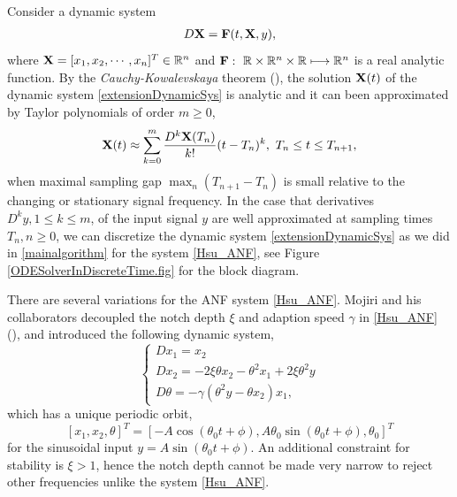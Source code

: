 \documentclass{UCF_ETD}
\begin{document}
Consider a  dynamic system
\begin{eqnarray} \label{extensionDynamicSys}
D{\bf X} = {\bf F}(t,{\bf X},y),
\end{eqnarray}
where
 ${\bf X} = [x_1,x_2,\cdots,x_n]^T \in {\mathbb R}^n$ and  ${\bf F}:\ {\mathbb R}\times {\mathbb R}^{n}\times {\mathbb R}\longmapsto {\mathbb R}^n$
is a real analytic function.
By  the  \emph{Cauchy-Kowalevskaya} theorem  (\cite{evans98}), the solution ${\bf X}(t)$ of
the dynamic system \eqref{extensionDynamicSys}
is analytic and it can been approximated by
Taylor polynomials of order $m\ge 0$, %
 \begin{equation}\label{generalxtapproximation}
 {\bf X}(t)\approx \sum_{k=0}^m \frac{D^k {\bf X}(T_n)}{k!} (t-T_n)^k,\  T_n\le t\le T_{n+1},
 \end{equation}
 when maximal sampling gap $\max_n (T_{n+1}-T_n)$ is small relative to the changing or stationary signal frequency. In the case that derivatives
 $D^ky, 1\le k\le m$, of the input signal $y$
are well approximated at sampling times $T_n, n\ge 0$,
 we can discretize the dynamic system \eqref{extensionDynamicSys}
 as we did in \eqref{mainalgorithm} for the system \eqref{Hsu_ANF}, see
 Figure \ref{ODESolverInDiscreteTime.fig}
 for the block diagram.  %


There are several variations for the ANF system %
 \eqref{Hsu_ANF}.
Mojiri and his collaborators decoupled the notch depth $\xi$ and adaption speed $\gamma$ in
\eqref{Hsu_ANF}  (\cite{mojiri04,mojiri07, mojiri07b}), and introduced the following dynamic system,
\begin{equation}
\label{Mojiri_ANF}
\left\{
\begin{array}{l}
D{x_1} = x_2   \\
D{x_2} = -2\xi \theta x_2 - {\theta}^2x_1 + 2\xi {\theta}^2y   \\
D{\theta} = -\gamma ({\theta}^2y - \theta x_2)x_1,
\end{array}
\right.
\end{equation}
which
 has  a unique periodic orbit,
$$
[x_1, x_2, {\theta}]^T = [ -A\cos(\theta_0 t + \phi), A \theta_0 \sin(\theta_0 t + \phi), \theta_0 ]^T
$$
for the sinusoidal input $y=A\sin (\theta_0 t+\phi)$. An additional constraint for stability is $\xi > 1$, hence the notch depth cannot be made very narrow to reject other frequencies unlike the system \eqref{Hsu_ANF}.
\end{document}
